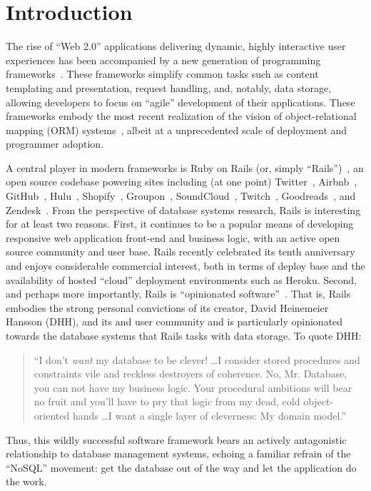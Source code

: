 
\section{Introduction}
\label{sec:intro}

The rise of ``Web 2.0'' applications delivering dynamic, highly
interactive user experiences has been accompanied by a new generation
of programming frameworks~\cite{web20}. These frameworks simplify
common tasks such as content templating and presentation, request
handling, and, notably, data storage, allowing developers to focus on
``agile'' development of their applications. These frameworks embody
the most recent realization of the vision of object-relational mapping
(ORM) systems~\cite{orm-db}, albeit at a unprecedented scale of deployment and
programmer adoption.

A central player in modern frameworks is Ruby on Rails (or, simply
``Rails'')~\cite{rails-book,rails-computer}, an open source codebase powering sites
including (at one point) Twitter~\cite{twitter-rails}, Airbnb~\cite{airbnb-rails},
GitHub~\cite{github-rails}, Hulu~\cite{hulu-rails}, Shopify~\cite{shopify-rails},
Groupon~\cite{groupon-rails}, SoundCloud~\cite{soundcloud-rails}, Twitch~\cite{twitch-rails},
Goodreads~\cite{goodreads-rails}, and Zendesk~\cite{zendesk-rails}. From the perspective of database systems
research, Rails is interesting for at least two reasons. First, it
continues to be a popular means of developing responsive web
application front-end and business logic, with an active open source
community and user base. Rails recently celebrated its tenth
anniversary and enjoys considerable commercial interest, both in terms
of deploy base and the availability of hosted ``cloud'' deployment environments such as
Heroku. Second, and perhaps more importantly, Rails is ``opinionated
software''~\cite{dhh-opinionated}. That is, Rails embodies the strong personal convictions
of its creator, David Heinemeier Hansson (DHH), and its and user
community and is particularly opinionated towards the database systems
that Rails tasks with data storage. To
quote DHH:
\begin{quote}
``I don't \textit{want} my database to be clever! \dots I consider stored procedures and constraints vile and reckless destroyers of coherence. No, Mr. Database, you can not have my business logic. Your procedural ambitions will bear no fruit and you'll have to pry that logic from my dead, cold object-oriented hands \dots I want a single layer of cleverness: My domain model.''~\cite{dhh-clever}
\end{quote}
Thus, this wildly successful software framework bears an actively
antagonistic relationship to database management systems, echoing a familiar refrain of the ``NoSQL'' movement: get the database out of the way and let the application do the work.

